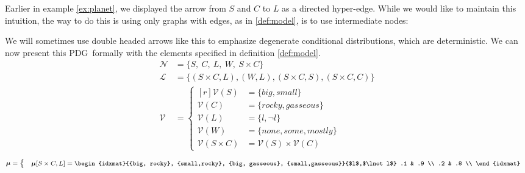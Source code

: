\documentclass{article}
\newcommand{\MN}{PDG}%
\begin{document}
	\begin{example}[continues=ex:planet]
		Earlier in example \ref{ex:planet}, we displayed the arrow from $S$ and $C$ to $L$ as a directed hyper-edge. While we would like to maintain this intuition, the way to do this is using only graphs with edges, as in \cref{def:model}, is to use intermediate nodes:
		
		\begin{center}
		\end{center}
		We will sometimes use double headed arrows like this to emphasize degenerate conditional distributions, which are deterministic.
		We can now present this \MN\ formally with the elements specified in definition \ref{def:model}.		
		\begin{align*}
			\mathcal N &= \{S,~ C, ~L, ~W, ~S\times C \} \\
			\mathcal L &= \{ (S \times C, L), (W, L), (S\times C, S), (S\times C, C)\} \\
			\mathcal V &= \begin{cases}[r]
			\mathcal V(S) &= \{\mathit{big}, \mathit{small} \}\\
			\mathcal V(C) &= \{ \mathit{rocky}, \mathit{gasseous} \} \\
			\mathcal V(L) &=  \{ l, \lnot l \} \\
			\mathcal V(W) &= \{ \textit{none}, \textit{some}, \textit{mostly}\}\\
			\mathcal V(S \times C) &= \mathcal V(S) \times \mathcal V(C) 
			\end{cases}
		\end{align*}
		\begin{align*}\footnotesize
			\boldsymbol\mu=\begin{cases}\quad
			\boldsymbol\mu[S\times C, L] = \begin{idxmat}{{big, rocky}, {small,rocky}, {big, gasseous}, {small,gasseous}}{$l$,$\lnot l$}
					.1 & .9 \\
					.2 & .8 \\

\end{idxmat}
\end{cases}
\end{align*}
\end{example}
\end{document}

